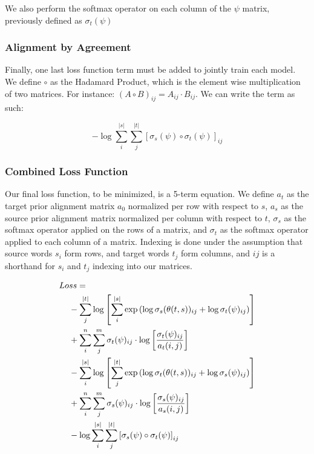 \documentclass[twoside,twocolumn]{article}
\begin{document}
We also perform the softmax operator on each column of the $\psi$ matrix,
previously defined as $\sigma_t(\psi)$


\subsubsection{Alignment by Agreement}

Finally, one last loss function term must be added to jointly train each model.
We define $\circ$ as the Hadamard Product, which is the element wise
multiplication of two matrices. For instance:
$(A \circ B)_{ij} = A_{ij} \cdot B_{ij}$. We can write the term as such:

\begin{equation}
  -\log \sum_i^{|s|} \sum_j^{|t|}
    \left[ \sigma_s(\psi) \circ \sigma_t(\psi) \right]_{ij}
\end{equation}



\subsubsection{Combined Loss Function}

Our final loss function, to be minimized, is a 5-term equation. We define $a_t$
as the target prior alignment matrix $a_0$ normalized per row with respect to $s$, $a_s$ as the source prior
alignment matrix normalized per column with respect to $t$, $\sigma_s$ as the softmax operator applied
on the rows of a matrix, and $\sigma_t$ as the softmax operator applied to each
column of a matrix. Indexing is done under the assumption that source words
$s_i$ form rows, and target words $t_j$ form columns, and $ij$ is a shorthand
for $s_i$ and $t_j$ indexing into our matrices.

\begin{equation}
  \centering
\begin{split}
  Lo&ss = \\
  &- \sum_j^{|t|} \log \left[
      \sum_i^{|s|} \exp \left(
        \log \sigma_s(\theta(t, s))_{ij} + \log \sigma_t(\psi)_{ij} \right)
    \right] \\
  &+ \sum_i^n \sum_j^m \sigma_t(\psi)_{ij} \cdot \log \left[
    \frac{\sigma_t(\psi)_{ij}}{a_t(i, j)} \right] \\
  &- \sum_i^{|s|} \log \left[ \sum_j^{|t|}
      \exp \left(
        \log \sigma_t(\theta(t, s))_{ij} + \log \sigma_s(\psi)_{ij}
      \right)
    \right] \\
  &+ \sum_i^n \sum_j^m \sigma_s(\psi)_{ij} \cdot \log \left[
    \frac{\sigma_s(\psi)_{ij}}{a_s(i, j)} \right] \\
  &- \log \sum_i^{|s|} \sum_j^{|t|} \left[
    \sigma_s(\psi) \circ \sigma_t(\psi) \right]_{ij} \\
\end{split}
\end{equation}
\end{document}

